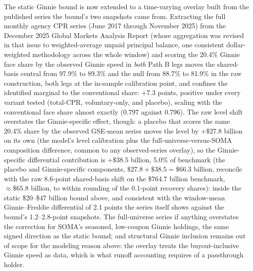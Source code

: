 \documentclass[12pt]{article}
\begin{document}
The static Ginnie bound is now extended to a time-varying overlay built from the published series the bound's two snapshots came from. Extracting the full monthly agency CPR series (June 2017 through November 2025) from the December 2025 Global Markets Analysis Report (whose aggregation was revised in that issue to weighted-average unpaid principal balance, one consistent dollar-weighted methodology across the whole window) and scoring the 20.4\% Ginnie face share by the observed Ginnie speed in \emph{both} Path B legs moves the shared-basis central from 97.9\% to 89.3\% and the null from 88.7\% to 81.9\% in the raw construction, both legs at the in-sample calibration point, and confines the identified marginal to the conventional share: $+7.3$ points, positive under every variant tested (total-CPR, voluntary-only, and placebo), scaling with the conventional face share almost exactly ($0.797$ against $0.796$). The raw level shift overstates the Ginnie-specific effect, though: a placebo that scores the same 20.4\% share by the observed GSE-mean series moves the level by $+\$27.8$ billion on its own (the model's level calibration plus the full-universe-versus-SOMA composition difference, common to any observed-series overlay), so the Ginnie-specific differential contribution is $+\$38.5$ billion, 5.0\% of benchmark (the placebo and Ginnie-specific components, $\$27.8 + \$38.5 = \$66.3$ billion, reconcile with the raw 8.6-point shared-basis shift on the \$764.7 billion benchmark, $\approx\$65.8$ billion, to within rounding of the 0.1-point recovery shares): inside the static \$20--\$47 billion bound above, and consistent with the window-mean Ginnie--Freddie differential of 2.1 points the series itself shows against the bound's 1.2--2.8-point snapshots. The full-universe series if anything overstates the correction for SOMA's seasoned, low-coupon Ginnie holdings, the same signed direction as the static bound; and structural Ginnie inclusion remains out of scope for the modeling reason above: the overlay treats the buyout-inclusive Ginnie speed as data, which is what runoff accounting requires of a passthrough holder.
\end{document}
